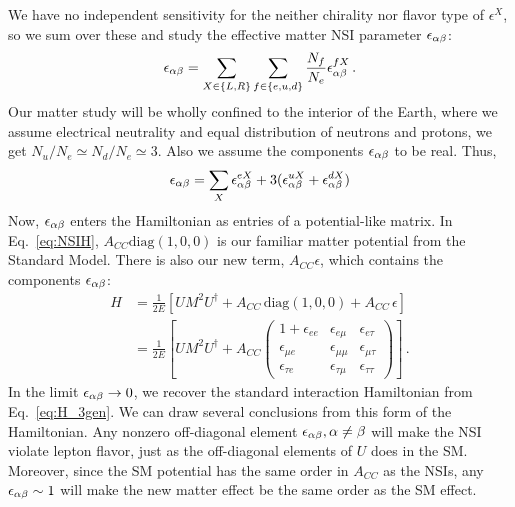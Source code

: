 We have no independent sensitivity for the neither chirality nor flavor type of $\epsilon^X$, so we sum over these and study the effective matter NSI parameter
 $\epsilon_{\alpha\beta}$:
\begin{align}
    \epsilon_{\alpha\beta} = \sum_{X \in \{L,R\}} \sum_{f \in \{e,u,d\}} \frac{N_f}{N_e} \epsilon^{fX}_{\alpha\beta}\,.
\end{align}
Our matter study will be wholly confined to the interior of the Earth, where we assume electrical neutrality and equal distribution of neutrons and protons, 
we get $N_u/N_e \simeq N_d/N_e \simeq 3$. Also we assume the components $\epsilon_{\alpha\beta}$ to be real. Thus,
\begin{align}
    \epsilon_{\alpha\beta} =  \sum_X \epsilon_{\alpha\beta}^{eX} + 3(\epsilon_{\alpha\beta}^{uX} + \epsilon_{\alpha\beta}^{dX})
\end{align}
Now, $\epsilon_{\alpha\beta}$ enters the Hamiltonian as entries of a potential-like matrix. In Eq.~\ref{eq:NSIH}, $A_{CC}\text{diag}(1,0,0)$ is our 
familiar matter potential from the Standard Model. There is also our new term, $A_{CC} \epsilon$, which contains the components $\epsilon_{\alpha\beta}$:
\begin{align}\label{eq:NSIH}
    H &= \frac{1}{2E} \left[UM^2U^\dagger + A_{CC}\,\text{diag}(1,0,0) + A_{CC}\, \epsilon \right] \nonumber \\
      &= \frac{1}{2E} \left[UM^2U^\dagger + A_{CC}
      \begin{pmatrix}
          1 + \epsilon_{ee} & \epsilon_{e\mu} & \epsilon_{e\tau}  \\
          \epsilon_{\mu e} & \epsilon_{\mu\mu} & \epsilon_{\mu\tau}  \\
          \epsilon_{\tau e} & \epsilon_{\tau\mu} & \epsilon_{\tau\tau}
      \end{pmatrix} \right]\,.
\end{align} 
In the limit $\epsilon_{\alpha\beta} \to 0$, we recover the standard interaction Hamiltonian from Eq.~\ref{eq:H_3gen}.
We can draw several conclusions from this form of the Hamiltonian. Any nonzero off-diagonal element $\epsilon_{\alpha\beta}, \alpha \neq \beta$ will make the NSI violate 
lepton flavor, just as the off-diagonal elements of $U$ does in the SM. Moreover, since the SM potential has the same order in $A_{CC}$ as the NSIs, 
any $\epsilon_{\alpha\beta} \sim 1$ will make the new matter effect be the same order as the SM effect.

